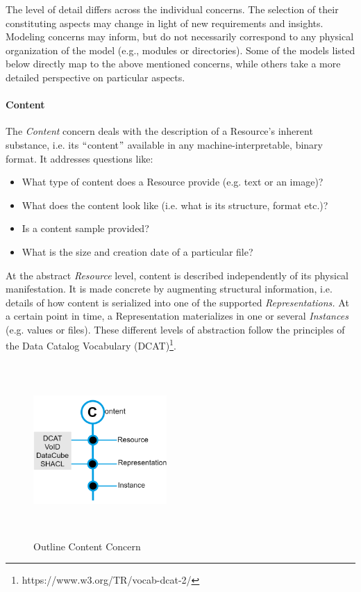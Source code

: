 The level of detail differs across the individual concerns. The selection of their constituting aspects may change in light of new requirements and insights. Modeling concerns may inform, but do not necessarily correspond to any physical organization of the model (e.g., modules or directories). Some of the models listed below directly map to the above mentioned concerns, while others take a more detailed perspective on particular aspects.

\paragraph{Content\\}


The \textit{Content }concern deals with the description of a Resource’s inherent substance, i.e. its $``$content$"$  available in any machine-interpretable, binary format. It addresses questions like: 
 \begin{itemize}
	\item What type of content does a Resource provide (e.g. text or an image)? 
 	\item What does the content look like (i.e. what is its structure, format etc.)? 
 	\item Is a content sample provided? 
 	\item What is the size and creation date of a particular file?
\end{itemize} 

At the abstract \textit{Resource} level, content is described independently of its physical manifestation. It is made concrete by augmenting structural information, i.e. details of how content is serialized into one of the supported \textit{Representations. }At a certain point in time, a Representation materializes in one or several \textit{Instances} (e.g. values or files).
These different levels of abstraction follow the principles of the Data Catalog Vocabulary (DCAT)\footnote{https://www.w3.org/TR/vocab-dcat-2/}.\\

\begin{figure}[H]
	\begin{Center}
		\includegraphics[width=2.0in,height=2.61in]{./media/image33.png}
		\caption{Outline Content Concern}
		\label{fig:outline_content_concern}
	\end{Center}
\end{figure}


